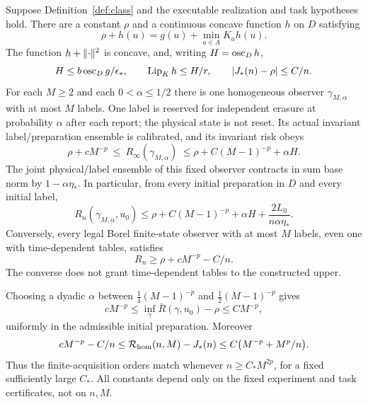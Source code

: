 \begin{theorem}\label{thm:main}
Suppose Definition~\ref{def:class} and the executable realization and task hypotheses hold. There are a constant $\rho$ and a continuous concave function $h$ on $D$ satisfying
\begin{equation}\label{eq:acoe}
 \rho+h(u)=g(u)+\min_{a\in A}K_ah(u).
\end{equation}
The function $h+\lVert\cdot\rVert^2$ is concave, and, writing $H=\operatorname{osc}_Dh$,
\begin{equation}\label{eq:bias-bounds}
 H\le b\operatorname{osc}_Dg/\epsilon_*,\qquad \operatorname{Lip}_Kh\le H/r,
 \qquad |J_*(n)-\rho|\le C/n.
\end{equation}
For each $M\ge2$ and each $0<\alpha\le1/2$ there is one homogeneous observer $\gamma_{M,\alpha}$ with at most $M$ labels. One label is reserved for independent erasure at probability $\alpha$ after each report; the physical state is not reset. Its actual invariant label/preparation ensemble is calibrated, and its invariant risk obeys
\begin{equation}\label{eq:stationary-bound}
 \rho+cM^{-p}\ \le\ R_\infty(\gamma_{M,\alpha})
 \ \le\rho+C(M-1)^{-p}+\alpha H.
\end{equation}
The joint physical/label ensemble of this fixed observer contracts in sum base norm by $1-\alpha\eta_*$. In particular, from every initial preparation in $D$ and every initial label,
\begin{equation}\label{eq:entrance}
 R_n(\gamma_{M,\alpha},u_0)
 \le \rho+C(M-1)^{-p}+\alpha H+\frac{2L_0}{n\alpha\eta_*}.
\end{equation}
Conversely, every legal Borel finite-state observer with at most $M$ labels, even one with time-dependent tables, satisfies
\begin{equation}\label{eq:converse-main}
 R_n\ge\rho+cM^{-p}-C/n.
\end{equation}
The converse does not grant time-dependent tables to the constructed upper.

Choosing a dyadic $\alpha$ between $\frac14(M-1)^{-p}$ and $\frac12(M-1)^{-p}$ gives
\begin{equation}\label{eq:average-law}
 cM^{-p}\le\inf_\gamma\bar R(\gamma,u_0)-\rho\le CM^{-p},
\end{equation}
uniformly in the admissible initial preparation. Moreover
\begin{equation}\label{eq:finite-law}
 cM^{-p}-C/n\le\mathcal R_{\rm hom}(n,M)-J_*(n)
 \le C\bigl(M^{-p}+M^p/n\bigr).
\end{equation}
Thus the finite-acquisition orders match whenever $n\ge C_*M^{2p}$, for a fixed sufficiently large $C_*$. All constants depend only on the fixed experiment and task certificates, not on $n,M$.
\end{theorem}

